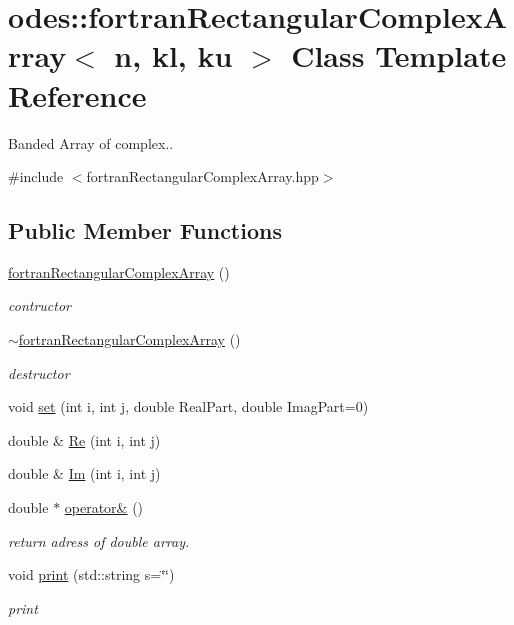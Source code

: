 \hypertarget{classodes_1_1fortranRectangularComplexArray}{\section{odes\-:\-:fortran\-Rectangular\-Complex\-Array$<$ n, kl, ku $>$ Class Template Reference}
\label{classodes_1_1fortranRectangularComplexArray}
}


Banded Array of complex..  




{\ttfamily \#include $<$fortran\-Rectangular\-Complex\-Array.\-hpp$>$}

\subsection*{Public Member Functions}
\begin{DoxyCompactItemize}
\item 
\hyperlink{classodes_1_1fortranRectangularComplexArray_a3350b7de9dcc01f0384bc676f7945680}{fortran\-Rectangular\-Complex\-Array} ()
\begin{DoxyCompactList}\small\item\em contructor \end{DoxyCompactList}\item 
\hyperlink{classodes_1_1fortranRectangularComplexArray_a3279352a8670d9606569870563b3396e}{$\sim$fortran\-Rectangular\-Complex\-Array} ()
\begin{DoxyCompactList}\small\item\em destructor \end{DoxyCompactList}\item 
void \hyperlink{classodes_1_1fortranRectangularComplexArray_a0afbfc5d739ef869582edcf28367402b}{set} (int i, int j, double Real\-Part, double Imag\-Part=0)
\item 
double \& \hyperlink{classodes_1_1fortranRectangularComplexArray_aac1f6f911dcd3b2acc8bb231d451be3d}{Re} (int i, int j)
\item 
double \& \hyperlink{classodes_1_1fortranRectangularComplexArray_abbb4a814d9b0f6305a90533d6ecccdc8}{Im} (int i, int j)
\item 
double $\ast$ \hyperlink{classodes_1_1fortranRectangularComplexArray_afa636966bb08ef793ffca369bea73cc2}{operator\&} ()
\begin{DoxyCompactList}\small\item\em return adress of double array. \end{DoxyCompactList}\item 
void \hyperlink{classodes_1_1fortranRectangularComplexArray_a8d912a7c2f32484a031e30aa95360fff}{print} (std\-::string s=\char`\"{}\char`\"{})
\begin{DoxyCompactList}\small\item\em print \end{DoxyCompactList}\end{DoxyCompactItemize}
